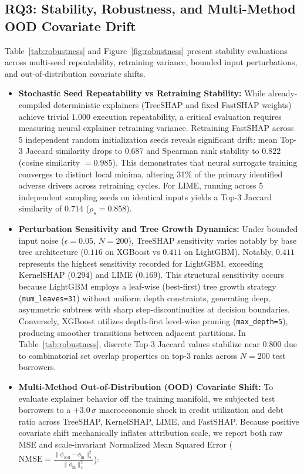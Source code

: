 \documentclass[conference]{IEEEtran}
\begin{document}
\subsection{RQ3: Stability, Robustness, and Multi-Method OOD Covariate Drift}
Table~\ref{tab:robustness} and Figure~\ref{fig:robustness} present stability evaluations across multi-seed repeatability, retraining variance, bounded input perturbations, and out-of-distribution covariate shifts.
\begin{itemize}
    \item \textbf{Stochastic Seed Repeatability vs Retraining Stability:} While already-compiled deterministic explainers (TreeSHAP and fixed FastSHAP weights) achieve trivial $1.000$ execution repeatability, a critical evaluation requires measuring neural explainer retraining variance. Retraining FastSHAP across 5 independent random initialization seeds reveals significant drift: mean Top-3 Jaccard similarity drops to $0.687$ and Spearman rank stability to $0.822$ (cosine similarity $= 0.985$). This demonstrates that neural surrogate training converges to distinct local minima, altering 31\% of the primary identified adverse drivers across retraining cycles. For LIME, running across 5 independent sampling seeds on identical inputs yields a Top-3 Jaccard similarity of $0.714$ ($\rho_s = 0.858$).
    \item \textbf{Perturbation Sensitivity and Tree Growth Dynamics:} Under bounded input noise ($\epsilon=0.05$, $N=200$), TreeSHAP sensitivity varies notably by base tree architecture ($0.116$ on XGBoost vs $0.411$ on LightGBM). Notably, $0.411$ represents the highest sensitivity recorded for LightGBM, exceeding KernelSHAP ($0.294$) and LIME ($0.169$). This structural sensitivity occurs because LightGBM employs a leaf-wise (best-first) tree growth strategy (\texttt{num\_leaves=31}) without uniform depth constraints, generating deep, asymmetric subtrees with sharp step-discontinuities at decision boundaries. Conversely, XGBoost utilizes depth-first level-wise pruning (\texttt{max\_depth=5}), producing smoother transitions between adjacent partitions. In Table~\ref{tab:robustness}, discrete Top-3 Jaccard values stabilize near $0.800$ due to combinatorial set overlap properties on top-3 ranks across $N=200$ test borrowers.
    \item \textbf{Multi-Method Out-of-Distribution (OOD) Covariate Shift:} To evaluate explainer behavior off the training manifold, we subjected test borrowers to a $+3.0\,\sigma$ macroeconomic shock in credit utilization and debt ratio across TreeSHAP, KernelSHAP, LIME, and FastSHAP. Because positive covariate shift mechanically inflates attribution scale, we report both raw MSE and scale-invariant Normalized Mean Squared Error ($\text{NMSE} = \frac{\|\phi_{\text{ood}} - \phi_{\text{in}}\|_2^2}{\|\phi_{\text{in}}\|_2^2}$):

\end{itemize}
\end{document}
